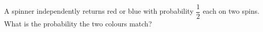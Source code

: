 A spinner independently returns red or blue with probability $\dfrac{1}{2}$ each on two spins. What is the probability the two colours match?
